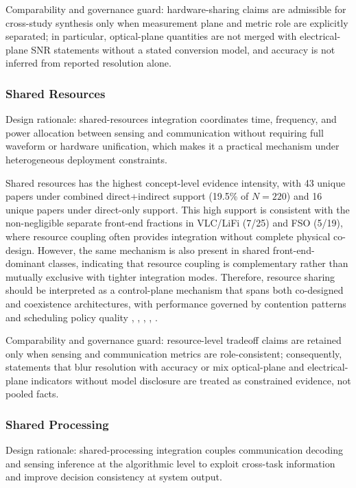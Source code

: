 Comparability and governance guard: hardware-sharing claims are admissible for cross-study synthesis only when measurement plane and metric role are explicitly separated; in particular, optical-plane quantities are not merged with electrical-plane SNR statements without a stated conversion model, and accuracy is not inferred from reported resolution alone.

\subsubsection{Shared Resources}
Design rationale: shared-resources integration coordinates time, frequency, and power allocation between sensing and communication without requiring full waveform or hardware unification, which makes it a practical mechanism under heterogeneous deployment constraints.

Shared resources has the highest concept-level evidence intensity, with 43 unique papers under combined direct+indirect support (19.5\% of $N=220$) and 16 unique papers under direct-only support. This high support is consistent with the non-negligible separate front-end fractions in VLC/LiFi (7/25) and FSO (5/19), where resource coupling often provides integration without complete physical co-design. However, the same mechanism is also present in shared front-end-dominant classes, indicating that resource coupling is complementary rather than mutually exclusive with tighter integration modes. Therefore, resource sharing should be interpreted as a control-plane mechanism that spans both co-designed and coexistence architectures, with performance governed by contention patterns and scheduling policy quality \cite{O_ISAC_061}, \cite{O_ISAC_114}, \cite{O_ISAC_142}, \cite{O_ISAC_141}, \cite{O_ISAC_021}.

Comparability and governance guard: resource-level tradeoff claims are retained only when sensing and communication metrics are role-consistent; consequently, statements that blur resolution with accuracy or mix optical-plane and electrical-plane indicators without model disclosure are treated as constrained evidence, not pooled facts.

\subsubsection{Shared Processing}
Design rationale: shared-processing integration couples communication decoding and sensing inference at the algorithmic level to exploit cross-task information and improve decision consistency at system output.

